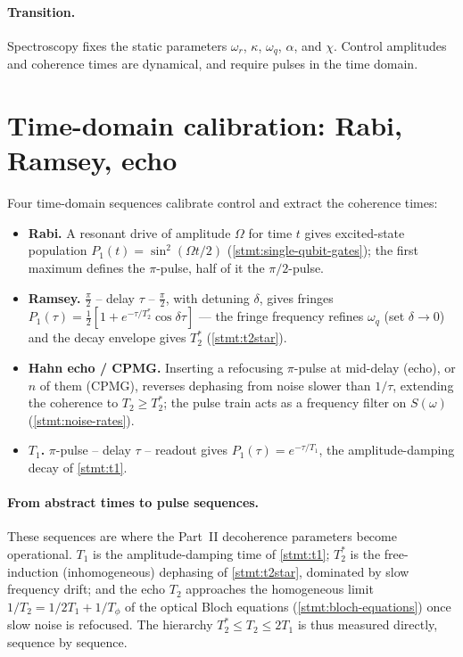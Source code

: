 \paragraph{Transition.}
Spectroscopy fixes the static parameters $\omega_r$, $\kappa$,
$\omega_q$, $\alpha$, and $\chi$. Control amplitudes and coherence times
are dynamical, and require pulses in the time domain.

\section{Time-domain calibration: Rabi, Ramsey, echo}
\label{sec:time-domain}

\begin{statement}
\label{stmt:time-domain}
Four time-domain sequences calibrate control and extract the coherence
times:
\begin{itemize}
\item \textbf{Rabi.} A resonant drive of amplitude $\Omega$ for time $t$
  gives excited-state population
  $P_1(t)=\sin^2(\Omega t/2)$ (\cref{stmt:single-qubit-gates}); the
  first maximum defines the $\pi$-pulse, half of it the $\pi/2$-pulse.
\item \textbf{Ramsey.} $\tfrac\pi2$ -- delay $\tau$ -- $\tfrac\pi2$,
  with detuning $\delta$, gives fringes
  $P_1(\tau)=\tfrac12[1+e^{-\tau/T_2^*}\cos\delta\tau]$ --- the fringe
  frequency refines $\omega_q$ (set $\delta\to0$) and the decay envelope
  gives $T_2^*$ (\cref{stmt:t2star}).
\item \textbf{Hahn echo / CPMG.} Inserting a refocusing $\pi$-pulse at
  mid-delay (echo), or $n$ of them (CPMG), reverses dephasing from noise
  slower than $1/\tau$, extending the coherence to $T_2\ge T_2^*$; the
  pulse train acts as a frequency filter on $S(\omega)$
  (\cref{stmt:noise-rates}).
\item \textbf{$T_1$.} $\pi$-pulse -- delay $\tau$ -- readout gives
  $P_1(\tau)=e^{-\tau/T_1}$, the amplitude-damping decay of
  \cref{stmt:t1}.
\end{itemize}
\end{statement}

\paragraph{From abstract times to pulse sequences.}
These sequences are where the Part~II decoherence parameters become
operational. $T_1$ is the amplitude-damping time of \cref{stmt:t1};
$T_2^*$ is the free-induction (inhomogeneous) dephasing of
\cref{stmt:t2star}, dominated by slow frequency drift; and the echo
$T_2$ approaches the homogeneous limit $1/T_2=1/2T_1+1/T_\phi$ of the
optical Bloch equations (\cref{stmt:bloch-equations}) once slow noise is
refocused. The hierarchy $T_2^*\le T_2\le2T_1$ is thus measured
directly, sequence by sequence.

